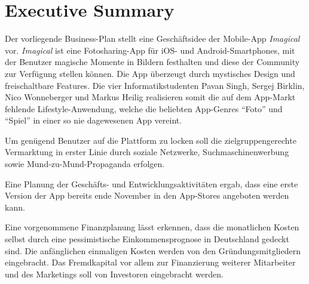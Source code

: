 \chapter{Executive Summary}

Der vorliegende Business-Plan stellt eine Geschäftsidee der Mobile-App \textit{Imagical} vor.
\textit{Imagical} ist eine Fotosharing-App für iOS- und Android-Smartphones, mit der Benutzer magische Momente in Bildern festhalten und diese der Community zur Verfügung stellen können. 
Die App überzeugt durch mystisches Design und freischaltbare Features.
Die vier Informatikstudenten Pavan Singh, Sergej Birklin, Nico Wonneberger und Markus Heilig realisieren somit die auf dem App-Markt fehlende Lifestyle-Anwendung, welche die beliebten App-Genres ``Foto'' und ``Spiel'' in einer so nie dagewesenen App vereint.

Um genügend Benutzer auf die Plattform zu locken soll die zielgruppengerechte Vermarktung in erster Linie durch soziale Netzwerke, Suchmaschinenwerbung sowie Mund-zu-Mund-Propaganda erfolgen. 

Eine Planung der Geschäfts- und Entwicklungsaktivitäten ergab, dass eine erste Version der App bereits ende November in den App-Stores angeboten werden kann.

Eine vorgenommene Finanzplanung lässt erkennen, dass die monatlichen Kosten selbst durch eine pessimistische Einkommensprognose in Deutschland gedeckt sind. Die anfänglichen einmaligen Kosten werden von den Gründungsmitgliedern eingebracht. Das Fremdkapital vor allem zur Finanzierung weiterer Mitarbeiter und des Marketings soll von Investoren eingebracht werden.
